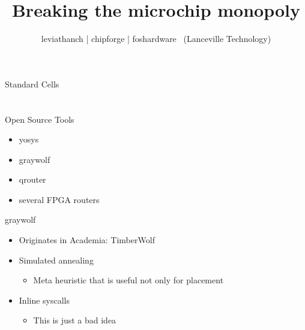 \documentclass[9pt]{beamer}
\author{leviathanch | chipforge | foshardware \ (Lanceville Technology)}
\title{Breaking the microchip monopoly}
\begin{document}

\section[Standard Cells]{}
\begin{frame}{Standard Cells}
\end{frame}

\section[Silicon Compiler]{}
\begin{frame}{Open Source Tools}
	\begin{itemize}
        \setlength\itemsep{1em}
		\item yosys
		\item graywolf
		\item qrouter
		\item several FPGA routers
	\end{itemize}
\end{frame}

\begin{frame}{graywolf}
	\begin{itemize}
        \setlength\itemsep{1em}
		\item Originates in Academia: TimberWolf
		\item Simulated annealing
	        \begin{itemize}
		    \item Meta heuristic that is useful not only for placement
	        \end{itemize}
		\item Inline syscalls
	        \begin{itemize}
		    \item This is just a bad idea
	        \end{itemize}
	\end{itemize}
\end{frame}
\end{document}
